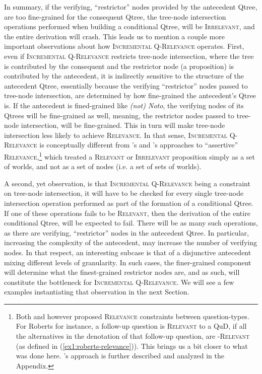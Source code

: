In summary, if the verifying, ``restrictor'' nodes provided by the antecedent Qtree, are too fine-grained for the consequent Qtree, the tree-node intersection operations performed when building a conditional Qtree, will be \textsc{Irrelevant}, and the entire derivation will crash. This leads us to mention a couple more important observations about how \textsc{Incremental Q-Relevance} operates. First, even if \textsc{Incremental Q-Relevance} restricts tree-node intersection, where the tree is contributed by the consequent and the restrictor node (a proposition) is contributed by the antecedent, it is indirectly sensitive to the structure of the antecedent Qtree, essentially because the verifying ``restrictor'' nodes passed to tree-node intersection, are determined by how fine-grained the antecedent's Qtree is. If the antecedent is fined-grained like \textit{(not) Noto}, the verifying nodes of its Qtrees will be fine-grained as well, meaning, the restrictor nodes passed to tree-node intersection, will be fine-grained. This in turn will make tree-node intersection less likely to achieve \textsc{Relevance}. In that sense, \textsc{Incremental Q-Relevance} is conceptually different from \citeauthor{Lewis1988}'s and \citet{Roberts2012}'s approaches to ``assertive'' \textsc{Relevance},\footnote{Both \citeauthor{Lewis1988} and \citet{Roberts2012} however proposed \textsc{Relevance} constraints between question-types. For Roberts for instance, a follow-up question is \textsc{Relevant} to a QuD, if all the alternatives in the denotation of that follow-up question, are \textsc{\citeauthor{Roberts2012}-Relevant} (as defined in (\ref{ex1:roberts-relevance})). This brings us a bit closer to what was done here. \citeauthor{Lewis1988}'s approach is further described and analyzed in the Appendix.} which treated a \textsc{Relevant} or \textsc{Irrelevant} proposition simply as a set of worlds, and not as a set of nodes (i.e. a set of sets of worlds).

A second, yet observation, is that \textsc{Incremental Q-Relevance} being a constraint on tree-node intersection, it will have to be checked for every single tree-node intersection operation performed as part of the formation of a conditional Qtree. If one of these operations fails to be \textsc{Relevant}, then the derivation of the entire conditional Qtree, will be expected to fail. There will be as many such operations, as there are verifying, ``restrictor'' nodes in the antecedent Qtree. In particular, increasing the complexity of the antecedent, may increase the number of verifying nodes. In that respect, an interesting subcase is that of a disjunctive antecedent mixing different levels of granularity. In such cases, the finer-grained component will determine what the finest-grained restrictor nodes are, and as such, will constitute the bottleneck for \textsc{Incremental Q-Relevance}. We will see a few examples instantiating that observation in the next Section.


